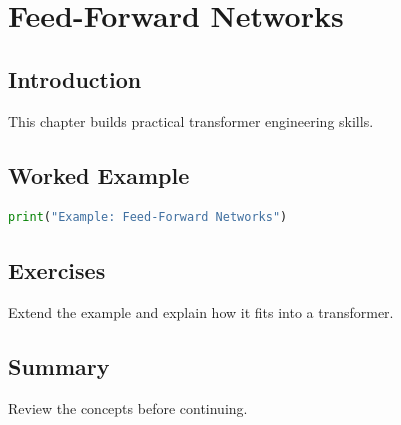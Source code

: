 \chapter{Feed-Forward Networks}
\label{chap:vol8-18}



\section{Introduction}
This chapter builds practical transformer engineering skills.

\section{Worked Example}
\begin{lstlisting}[language=Python]
print("Example: Feed-Forward Networks")
\end{lstlisting}

\section{Exercises}
\begin{exercise}
Extend the example and explain how it fits into a transformer.
\end{exercise}

\section{Summary}
Review the concepts before continuing.
